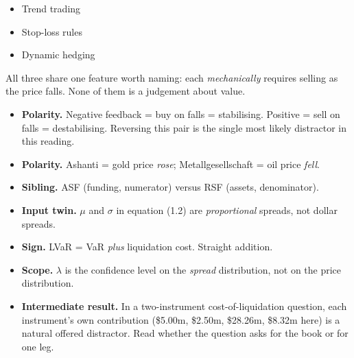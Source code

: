 \begin{lrkeybox}
\begin{itemize}
\item Trend trading
\item Stop-loss rules
\item Dynamic hedging
\end{itemize}
All three share one feature worth naming: each \emph{mechanically} requires selling as the price falls. None of them is a judgement about value.
\end{lrkeybox}

\begin{lrtrapbox}
\begin{itemize}
\item \textbf{Polarity.} Negative feedback = buy on falls = stabilising. Positive = sell on falls = destabilising. Reversing this pair is the single most likely distractor in this reading.
\item \textbf{Polarity.} Ashanti = gold price \emph{rose}; Metallgesellschaft = oil price \emph{fell}.
\item \textbf{Sibling.} ASF (funding, numerator) versus RSF (assets, denominator).
\item \textbf{Input twin.} $\mu$ and $\sigma$ in equation (1.2) are \emph{proportional} spreads, not dollar spreads.
\item \textbf{Sign.} LVaR = VaR \emph{plus} liquidation cost. Straight addition.
\item \textbf{Scope.} $\lambda$ is the confidence level on the \emph{spread} distribution, not on the price distribution.
\item \textbf{Intermediate result.} In a two-instrument cost-of-liquidation question, each instrument's own contribution (\$5.00m, \$2.50m, \$28.26m, \$8.32m here) is a natural offered distractor. Read whether the question asks for the book or for one leg.
\end{itemize}
\end{lrtrapbox}
